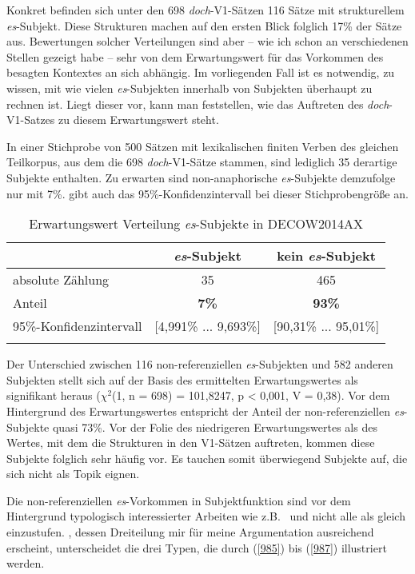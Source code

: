 {Konkret befinden sich unter den 698 \textit{doch}-V1-Sätzen 116 Sätze mit strukturellem \textit{es}-Subjekt. Diese Strukturen machen auf den ersten Blick folglich 17\% der Sätze aus. Bewertungen solcher Verteilungen sind aber – wie ich schon an verschiedenen Stellen gezeigt habe – sehr von dem Erwartungswert für das Vorkommen des besagten Kontextes an sich abhängig. Im vorliegenden Fall ist es notwendig, zu wissen, mit wie vielen \textit{es}-Subjekten innerhalb von Subjekten überhaupt zu rechnen ist. Liegt dieser vor, kann man feststellen, wie das Auftreten des \textit{doch}-V1-Satzes zu diesem Erwartungswert steht.	

In einer Stichprobe von 500 Sätzen mit lexikalischen finiten Verben des glei\-chen Teilkorpus, aus dem die 698 \textit{doch}-V1-Sätze stammen, sind lediglich 35 derartige Subjekte enthalten. Zu erwarten sind non-anaphorische \textit{es}-Subjekte demzufolge nur mit 7\%.  gibt auch das 95\%-Konfidenzintervall bei dieser Stichprobengröße an.

\begin{table}
	\caption{\label{tab:984}Erwartungswert Verteilung \textit{es}-Subjekte in DECOW2014AX}
 		\begin{tabular}[t]{lcc} 
 		\lsptoprule 	
   	 	& {\textit{es}-Subjekt} & {kein \textit{es}-Subjekt} \\
   	 	\midrule
  		absolute Zählung & 35 & 465\\ 
   		Anteil & \textbf{7\%} & \textbf{93\%}\\
   		95\%-Konfidenzintervall & [4,991\% ... 9,693\%] & [90,31\% ... 95,01\%] \\
		\lspbottomrule
 		\end{tabular}
\end{table}
Der Unterschied zwischen 116 non-referenziellen \textit{es}-Subjekten und 582 anderen Subjekten stellt sich auf der Basis des ermittelten Erwartungswertes als signifikant heraus ($\chi^{2}$(1, n = 698) = 101,8247, p < 0,001, V = 0,38). Vor dem Hintergrund des Erwartungswertes entspricht der Anteil der non-referenziellen \textit{es}-Subjekte quasi 73\%. Vor der Folie des niedrigeren Erwartungswertes als des Wertes, mit dem die Strukturen in den V1-Sätzen auftreten, kommen diese Subjekte folglich sehr häufig vor. Es tauchen somit überwiegend Subjekte auf, die sich nicht als Topik eignen.

Die non-referenziellen \textit{es}-Vorkommen in Subjektfunktion sind vor dem Hintergrund typologisch interessierter Arbeiten wie z.B.\ \citet{Askedal1990} und \citet{Zitterbart2002} nicht alle als gleich einzustufen. \citet{Speyer2009}, dessen Dreiteilung mir für meine Argumentation ausreichend erscheint, unterscheidet die drei Typen, die durch (\ref{985}) bis (\ref{987}) illustriert werden. 

}
